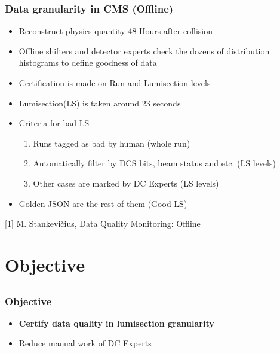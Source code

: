\documentclass{beamer}
\begin{document}

\begin{frame}
\frametitle{Data granularity in CMS (Offline)}
\begin{itemize}
    \item Reconstruct physics quantity 48 Hours after collision 
    \item Offline shifters and detector experts check the dozens of distribution histograms to define goodness of data
    \item Certification is made on Run and Lumisection levels
    \item Lumisection(LS) is taken around 23 seconds
    \item Criteria for bad LS
    \begin{enumerate}
        \item Runs tagged as bad by human (whole run)
        \item Automatically filter by DCS bits, beam status and etc. (LS levels)
        \item Other cases are marked by DC Experts (LS levels)
    \end{enumerate}
    \item Golden JSON are the rest of them (Good LS)
\end{itemize}
\vspace{0.4in}\tiny [1] M. Stankevičius, Data Quality Monitoring: Offline
\end{frame}

\section{Objective} %
\subsection{}

\begin{frame}
\frametitle{Objective}
\begin{itemize}
    \item \textbf{Certify data quality in lumisection granularity}
    \item Reduce manual work of DC Experts
\end{itemize}
\end{frame}
\end{document}
